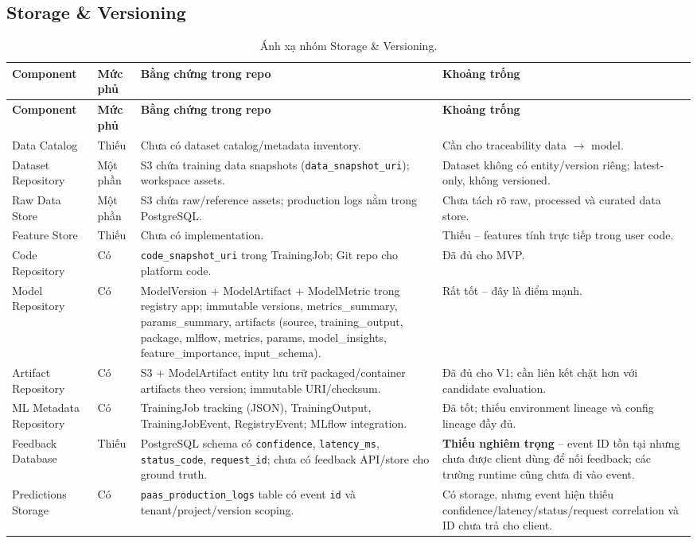 \documentclass[11pt,a4paper]{article}
\newcommand{\statusyes}{\textcolor{green!45!black}{Có}}
\newcommand{\statuspartial}{\textcolor{orange!75!black}{Một phần}}
\newcommand{\statusno}{\textcolor{red!60!black}{Thiếu}}
\newcommand{\codepath}[1]{\texttt{\small #1}}
\begin{document}
\subsection{Storage \& Versioning}

\begin{longtable}{@{}P{2.6cm}P{1.6cm}P{4.7cm}P{4.5cm}@{}}
\caption{Ánh xạ nhóm Storage \& Versioning.}\\
\toprule
\textbf{Component} & \textbf{Mức phủ} & \textbf{Bằng chứng trong repo} & \textbf{Khoảng trống} \\
\midrule
\endfirsthead
\toprule
\textbf{Component} & \textbf{Mức phủ} & \textbf{Bằng chứng trong repo} & \textbf{Khoảng trống} \\
\midrule
\endhead
Data Catalog & \statusno & Chưa có dataset catalog/metadata inventory. & Cần cho traceability data $\rightarrow$ model. \\
\addlinespace
Dataset Repository & \statuspartial & S3 chứa training data snapshots (\codepath{data\_snapshot\_uri}); workspace assets. & Dataset không có entity/version riêng; latest-only, không versioned. \\
\addlinespace
Raw Data Store & \statuspartial & S3 chứa raw/reference assets; production logs nằm trong PostgreSQL. & Chưa tách rõ raw, processed và curated data store. \\
\addlinespace
Feature Store & \statusno & Chưa có implementation. & Thiếu -- features tính trực tiếp trong user code. \\
\addlinespace
Code Repository & \statusyes & \codepath{code\_snapshot\_uri} trong TrainingJob; Git repo cho platform code. & Đã đủ cho MVP. \\
\addlinespace
Model Repository & \statusyes & ModelVersion + ModelArtifact + ModelMetric trong registry app; immutable versions, metrics\_summary, params\_summary, artifacts (source, training\_output, package, mlflow, metrics, params, model\_insights, feature\_importance, input\_schema). & Rất tốt -- đây là điểm mạnh. \\
\addlinespace
Artifact Repository & \statusyes & S3 + ModelArtifact entity lưu trữ packaged/container artifacts theo version; immutable URI/checksum. & Đã đủ cho V1; cần liên kết chặt hơn với candidate evaluation. \\
\addlinespace
ML Metadata Repository & \statusyes & TrainingJob tracking (JSON), TrainingOutput, TrainingJobEvent, RegistryEvent; MLflow integration. & Đã tốt; thiếu environment lineage và config lineage đầy đủ. \\
\addlinespace
Feedback Database & \statusno & PostgreSQL schema có \codepath{confidence}, \codepath{latency\_ms}, \codepath{status\_code}, \codepath{request\_id}; chưa có feedback API/store cho ground truth. & \textbf{Thiếu nghiêm trọng} -- event ID tồn tại nhưng chưa được client dùng để nối feedback; các trường runtime cũng chưa đi vào event. \\
\addlinespace
Predictions Storage & \statusyes & \codepath{paas\_production\_logs} table có event \codepath{id} và tenant/project/version scoping. & Có storage, nhưng event hiện thiếu confidence/latency/status/request correlation và ID chưa trả cho client. \\
\bottomrule
\end{longtable}
\end{document}
